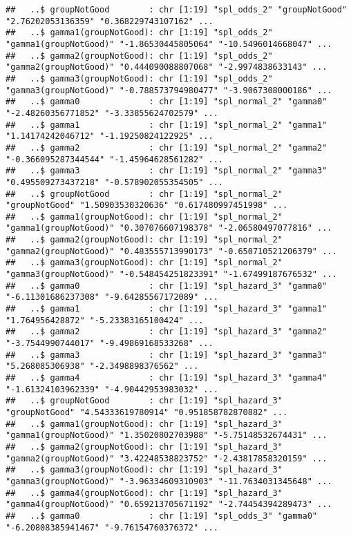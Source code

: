 \documentclass[
]{article}
\begin{document}
\begin{verbatim}
##   ..$ groupNotGood        : chr [1:19] "spl_odds_2" "groupNotGood" "2.76202053136359" "0.368229743107162" ...
##   ..$ gamma1(groupNotGood): chr [1:19] "spl_odds_2" "gamma1(groupNotGood)" "-1.86530445805064" "-10.5496014668047" ...
##   ..$ gamma2(groupNotGood): chr [1:19] "spl_odds_2" "gamma2(groupNotGood)" "0.444090088807068" "-2.9974838633143" ...
##   ..$ gamma3(groupNotGood): chr [1:19] "spl_odds_2" "gamma3(groupNotGood)" "-0.788573794980477" "-3.9067308000186" ...
##   ..$ gamma0              : chr [1:19] "spl_normal_2" "gamma0" "-2.48260356771852" "-3.33855624702579" ...
##   ..$ gamma1              : chr [1:19] "spl_normal_2" "gamma1" "1.14174242046712" "-1.19250824122925" ...
##   ..$ gamma2              : chr [1:19] "spl_normal_2" "gamma2" "-0.366095287344544" "-1.45964628561282" ...
##   ..$ gamma3              : chr [1:19] "spl_normal_2" "gamma3" "0.495509273437218" "-0.578902055354505" ...
##   ..$ groupNotGood        : chr [1:19] "spl_normal_2" "groupNotGood" "1.50903530320636" "0.617480997451998" ...
##   ..$ gamma1(groupNotGood): chr [1:19] "spl_normal_2" "gamma1(groupNotGood)" "0.307076607198378" "-2.06580497077816" ...
##   ..$ gamma2(groupNotGood): chr [1:19] "spl_normal_2" "gamma2(groupNotGood)" "0.483555713990173" "-0.650710521206379" ...
##   ..$ gamma3(groupNotGood): chr [1:19] "spl_normal_2" "gamma3(groupNotGood)" "-0.548454251823391" "-1.67499187676532" ...
##   ..$ gamma0              : chr [1:19] "spl_hazard_3" "gamma0" "-6.11301686237308" "-9.64285567172089" ...
##   ..$ gamma1              : chr [1:19] "spl_hazard_3" "gamma1" "1.764956428872" "-5.23383165100424" ...
##   ..$ gamma2              : chr [1:19] "spl_hazard_3" "gamma2" "-3.7544990744017" "-9.49869168533268" ...
##   ..$ gamma3              : chr [1:19] "spl_hazard_3" "gamma3" "5.268085306938" "-2.3498898376562" ...
##   ..$ gamma4              : chr [1:19] "spl_hazard_3" "gamma4" "-1.61324103962339" "-4.90442953983032" ...
##   ..$ groupNotGood        : chr [1:19] "spl_hazard_3" "groupNotGood" "4.54333619780914" "0.951858782870882" ...
##   ..$ gamma1(groupNotGood): chr [1:19] "spl_hazard_3" "gamma1(groupNotGood)" "1.35020802703988" "-5.75148532674431" ...
##   ..$ gamma2(groupNotGood): chr [1:19] "spl_hazard_3" "gamma2(groupNotGood)" "3.42248538823752" "-2.43817858320159" ...
##   ..$ gamma3(groupNotGood): chr [1:19] "spl_hazard_3" "gamma3(groupNotGood)" "-3.96334609310903" "-11.7634031345648" ...
##   ..$ gamma4(groupNotGood): chr [1:19] "spl_hazard_3" "gamma4(groupNotGood)" "0.659213705671192" "-2.74454394289473" ...
##   ..$ gamma0              : chr [1:19] "spl_odds_3" "gamma0" "-6.20808385941467" "-9.76154760376372" ...

\end{verbatim}
\end{document}

